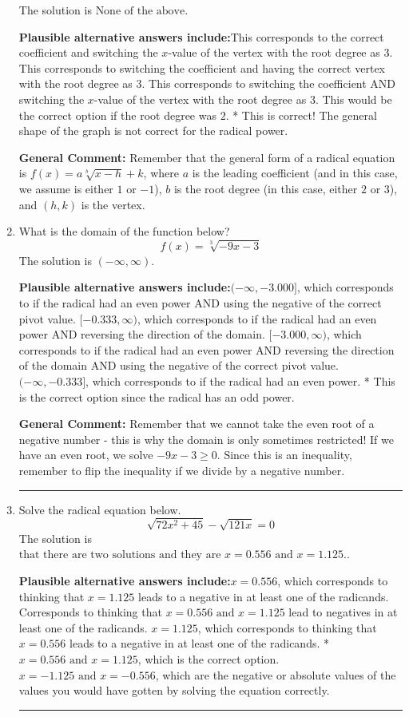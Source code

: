 \documentclass{extbook}[14pt]
\newcommand{\litem}[1]{\item #1

\rule{\textwidth}{0.4pt}}
\begin{document}
\begin{enumerate}
{The solution is \( \text{None of the above} \).\begin{enumerate}[label=\Alph*.]
\textbf{Plausible alternative answers include:}This corresponds to the correct coefficient and switching the $x$-value of the vertex with the root degree as $3$.
This corresponds to switching the coefficient and having the correct vertex with the root degree as $3$.
This corresponds to switching the coefficient AND switching the $x$-value of the vertex with the root degree as $3$.
This would be the correct option if the root degree was $2$.
* This is correct! The general shape of the graph is not correct for the radical power.
\end{enumerate}

\textbf{General Comment:} Remember that the general form of a radical equation is $ f(x) = a \sqrt[b]{x - h} + k$, where $a$ is the leading coefficient (and in this case, we assume is either $1$ or $-1$), $b$ is the root degree (in this case, either $2$ or $3$), and $(h, k)$ is the vertex.
}
\litem{
What is the domain of the function below?
\[ f(x) = \sqrt[3]{-9 x - 3} \]The solution is \( (-\infty, \infty) \).\begin{enumerate}[label=\Alph*.]
\textbf{Plausible alternative answers include:}$(-\infty, -3.000]$, which corresponds to if the radical had an even power AND using the negative of the correct pivot value.
$[-0.333, \infty)$, which corresponds to if the radical had an even power AND reversing the direction of the domain.
$[-3.000, \infty)$, which corresponds to if the radical had an even power AND reversing the direction of the domain AND using the negative of the correct pivot value.
$(-\infty, -0.333]$, which corresponds to if the radical had an even power.
* This is the correct option since the radical has an odd power.
\end{enumerate}

\textbf{General Comment:} Remember that we cannot take the even root of a negative number - this is why the domain is only sometimes restricted! If we have an even root, we solve $-9 x - 3 \geq 0$. Since this is an inequality, remember to flip the inequality if we divide by a negative number.
}
\litem{
Solve the radical equation below.
\[ \sqrt{72 x^2 + 45} - \sqrt{121 x} = 0 \]The solution is \( \text{that there are two solutions and they are } x = 0.556 \text{ and } x = 1.125. \).\begin{enumerate}[label=\Alph*.]
\textbf{Plausible alternative answers include:}$x = 0.556$, which corresponds to thinking that $x = 1.125$ leads to a negative in at least one of the radicands.
Corresponds to thinking that $x = 0.556 \text{ and } x = 1.125$ lead to negatives in at least one of the radicands.
$x = 1.125$, which corresponds to thinking that $x = 0.556$ leads to a negative in at least one of the radicands.
* $x = 0.556 \text{ and } x = 1.125$, which is the correct option.
$x = -1.125 \text{ and } x = -0.556$, which are the negative or absolute values of the values you would have gotten by solving the equation correctly.
\end{enumerate}

}
\end{enumerate}
\end{document}
